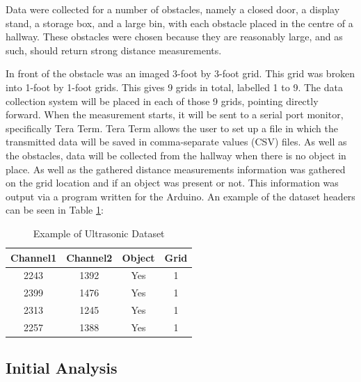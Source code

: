 \documentclass[conference]{IEEEtran}
\begin{document}
Data were collected for a number of obstacles, namely a closed door, a display stand, a storage box, and a large bin, with each obstacle placed in the centre of a hallway. These obstacles were chosen because they are reasonably large, and as such, should return strong distance measurements. 

In front of the obstacle was an imaged 3-foot by 3-foot grid. This grid was broken into 1-foot by 1-foot grids. This gives 9 grids in total, labelled 1 to 9. The data collection system will be placed in each of those 9 grids, pointing directly forward. When the measurement starts, it will be sent to a serial port monitor, specifically Tera Term. Tera Term allows the user to set up a file in which the transmitted data will be saved in comma-separate values (CSV) files. As well as the obstacles, data will be collected from the hallway when there is no object in place. As well as the gathered distance measurements information was gathered on the grid location and if an object was present or not. This information was output via a program written for the Arduino. An example of the dataset headers can be seen in Table \ref{table:1}:

\begin{table}[h!]
\centering
\begin{tabular}{||c c c c||} 
 \hline
 Channel1 & Channel2 & Object & Grid \\ [0.5ex] 
 \hline\hline
 2243 & 1392 & Yes & 1 \\ 
 \hline
 2399 & 1476 & Yes & 1 \\
 \hline
 2313 & 1245 & Yes & 1 \\
 \hline
 2257 & 1388 & Yes & 1 \\ [1ex] 
 \hline
\end{tabular}
\caption{Example of Ultrasonic Dataset}
\label{table:1}
\end{table}

\subsection{Initial Analysis}





\printbibliography
\vspace{12pt}
\end{document}
